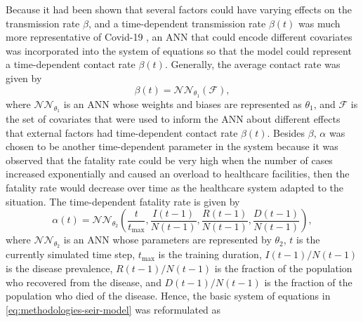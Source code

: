 Because it had been shown that several factors could have varying effects on the transmission rate $\beta$, and a time-dependent transmission rate $\beta(t)$ was much more representative of Covid-19 \cite{arikInterpretableSequenceLearning, changMobilityNetworkModels2021, dandekarMachineLearningAidedGlobal2020a, ihmecovid-19forecastingteamModelingCOVID19Scenarios2021, liSubstantialUndocumentedInfection2020}, an \gls{ANN} that could encode different covariates was incorporated into the system of equations so that the model could represent a time-dependent contact rate $\beta(t)$.
Generally, the average contact rate was given by
\begin{equation}
    \beta(t) = \mathcal{NN}_{\theta_1}(\mathcal{F}),
    \label{eq:methodologies-seir-time-dependent-contact-rate}
\end{equation}
where $\mathcal{NN}_{\theta_1}$ is an \gls{ANN} whose weights and biases are represented as $\theta_1$, and $\mathcal{F}$ is the set of covariates that were used to inform the \gls{ANN} about different effects that external factors had time-dependent contact rate $\beta(t)$.
Besides $\beta$, $\alpha$ was chosen to be another time-dependent parameter in the system because it was observed that the fatality rate could be very high when the number of cases increased exponentially and caused an overload to healthcare facilities, then the fatality rate would decrease over time as the healthcare system adapted to the situation.
The time-dependent fatality rate is given by
\begin{equation*}
    \alpha(t) = \mathcal{NN}_{\theta_2} (\frac{t}{t_\text{max}}, \frac{I(t-1)}{N(t-1)}, \frac{R(t-1)}{N(t-1)}, \frac{D(t-1)}{N(t-1)}),
\end{equation*}
where $\mathcal{NN}_{\theta_2}$ is an \gls{ANN} whose parameters are represented by $\theta_2$, $t$ is the currently simulated time step, $t_\text{max}$ is the training duration, $I(t-1)/N(t-1)$ is the disease prevalence, $R(t-1)/N(t-1)$ is the fraction of the population who recovered from the disease, and $D(t-1)/N(t-1)$ is the fraction of the population who died of the disease.
Hence, the basic system of equations in \autoref{eq:methodologies-seir-model} was reformulated as
